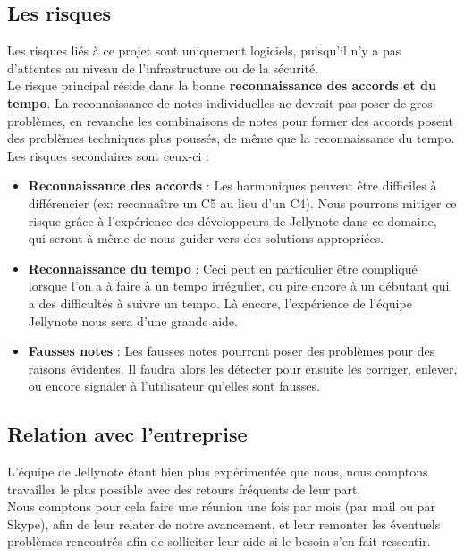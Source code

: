 \documentclass[12pt]{article}
\begin{document}
\newpage
\subsection{Les risques}

Les risques liés à ce projet sont uniquement logiciels, puisqu’il n’y a pas d’attentes au niveau de l’infrastructure ou de la sécurité.\\

Le risque principal réside dans la bonne \textbf{reconnaissance des accords et du tempo}. La reconnaissance de notes individuelles ne devrait pas poser de gros problèmes, en revanche les combinaisons de notes pour former des accords posent des problèmes techniques plus poussés, de même que la reconnaissance du tempo.\\

Les risques secondaires sont ceux-ci :
\begin{itemize}
\item \textbf{Reconnaissance des accords} : Les harmoniques peuvent être difficiles à différencier (ex: reconnaître un C5 au lieu d’un C4). Nous pourrons mitiger ce risque grâce à l’expérience des développeurs de Jellynote dans ce domaine, qui seront à même de nous guider vers des solutions appropriées.
\item \textbf{Reconnaissance du tempo} : Ceci peut en particulier être compliqué lorsque l’on a à faire à un tempo irrégulier, ou pire encore à un débutant qui a des difficultés à suivre un tempo. Là encore, l’expérience de l’équipe Jellynote nous sera d’une grande aide.
\item \textbf{Fausses notes} : Les fausses notes pourront poser des problèmes pour des raisons évidentes. Il faudra alors les détecter pour ensuite les corriger, enlever, ou encore signaler à l’utilisateur qu’elles sont fausses.
\end{itemize}

\subsection{Relation avec l'entreprise}

L’équipe de Jellynote étant bien plus expérimentée que nous, nous comptons travailler le plus possible avec des retours fréquents de leur part.\\

Nous comptons pour cela faire une réunion une fois par mois (par mail ou par Skype), afin de leur relater de notre avancement, et leur remonter les éventuels problèmes rencontrés afin de solliciter leur aide si le besoin s’en fait ressentir.\\
\end{document}
